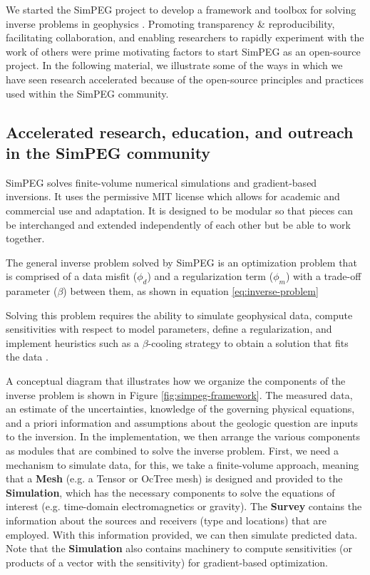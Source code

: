 We started the SimPEG project to develop a framework and toolbox for solving inverse problems in geophysics \cite{cockett_simpeg_2015}. Promoting transparency \& reproducibility, facilitating collaboration, and enabling researchers to rapidly experiment with the work of others were prime motivating factors to start SimPEG as an open-source project. In the following material, we illustrate some of the ways in which we have seen research accelerated because of the open-source principles and practices used within the SimPEG community.


\subsection{Accelerated research, education, and outreach in the SimPEG community}

SimPEG solves finite-volume numerical simulations and gradient-based inversions. It uses the permissive MIT license which allows for academic and commercial use and adaptation. It is designed to be modular so that pieces can be interchanged and extended independently of each other but be able to work together.

The general inverse problem solved by SimPEG is an optimization problem that is comprised of a data misfit ($\phi_d$) and a regularization term ($\phi_m$) with a trade-off parameter ($\beta$) between them, as shown in equation \ref{eq:inverse-problem}

Solving this problem requires the ability to simulate geophysical data, compute sensitivities with respect to model parameters, define a regularization, and implement heuristics such as a $\beta$-cooling strategy to obtain a solution that fits the data \citep{Oldenburg2005}.

A conceptual diagram that illustrates how we organize the components of the inverse problem is shown in Figure \ref{fig:simpeg-framework}. The measured data, an estimate of the uncertainties, knowledge of the governing physical equations, and a priori information and assumptions about the geologic question are inputs to the inversion. In the implementation, we then arrange the various components as modules that are combined to solve the inverse problem. First, we need a mechanism to simulate data, for this, we take a finite-volume approach, meaning that a \textbf{Mesh} (e.g. a Tensor or OcTree mesh) is designed and provided to the \textbf{Simulation}, which has the necessary components to solve the equations of interest (e.g. time-domain electromagnetics or gravity). The \textbf{Survey} contains the information about the sources and receivers (type and locations) that are employed. With this information provided, we can then simulate predicted data. Note that the \textbf{Simulation} also contains machinery to compute sensitivities (or products of a vector with the sensitivity) for gradient-based optimization.

